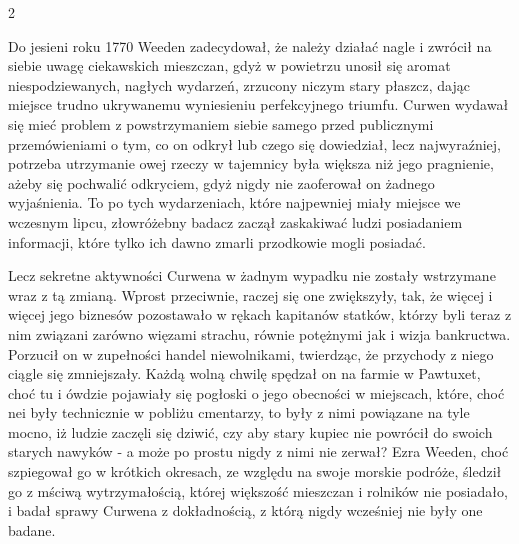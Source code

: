\begin{center}
2
\end{center}

Do jesieni roku 1770 Weeden zadecydował, że należy działać nagle i zwrócił na siebie uwagę ciekawskich mieszczan, gdyż w powietrzu unosił się aromat niespodziewanych, nagłych wydarzeń, zrzucony niczym stary płaszcz, dając miejsce trudno ukrywanemu wyniesieniu perfekcyjnego triumfu. Curwen wydawał się mieć problem z powstrzymaniem siebie samego przed publicznymi przemówieniami o tym, co on odkrył lub czego się dowiedział, lecz najwyraźniej, potrzeba utrzymanie owej rzeczy w tajemnicy była większa niż jego pragnienie, ażeby się pochwalić odkryciem, gdyż nigdy nie zaoferował on żadnego wyjaśnienia. To po tych wydarzeniach, które najpewniej miały miejsce we wczesnym lipcu, złowróżebny badacz zaczął zaskakiwać ludzi posiadaniem informacji, które tylko ich dawno zmarli przodkowie mogli posiadać.

Lecz sekretne aktywności Curwena w żadnym wypadku nie zostały wstrzymane wraz z tą zmianą. Wprost przeciwnie, raczej się one zwiększyły, tak, że więcej i więcej jego biznesów pozostawało w rękach kapitanów statków, którzy byli teraz z nim związani zarówno więzami strachu, równie potężnymi jak i wizja bankructwa. Porzucił on w zupełności handel niewolnikami, twierdząc, że przychody z niego ciągle się zmniejszały. Każdą wolną chwilę spędzał on na farmie w Pawtuxet, choć tu i ówdzie pojawiały się pogłoski o jego obecności w miejscach, które, choć nei były technicznie w pobliżu cmentarzy, to były z nimi powiązane na tyle mocno, iż ludzie zaczęli się dziwić, czy aby stary kupiec nie powrócił do swoich starych nawyków - a może po prostu nigdy z nimi nie zerwał? Ezra Weeden, choć szpiegował go w krótkich okresach, ze względu na swoje morskie podróże, śledził go z mściwą wytrzymałością, której większość mieszczan i rolników nie posiadało, i badał sprawy Curwena z dokładnością, z którą nigdy wcześniej nie były one badane. 

